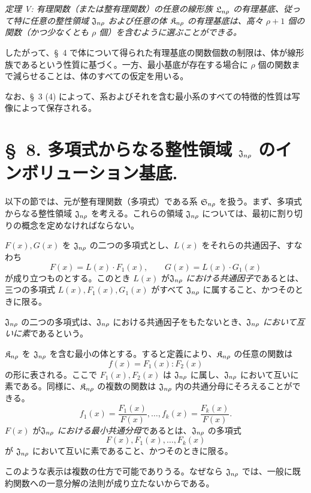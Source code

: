 \documentclass[11pt]{article}
\begin{document}
\emph{定理 V: 有理関数（または整有理関数）の任意の線形族 $\mathfrak{L}_{n\rho}$ の有理基底、従って特に任意の整性領域 $\mathfrak{J}_{n\rho}$ および任意の体 $\mathfrak{K}_{n\rho}$ の有理基底は、高々 $\rho+1$ 個の関数（かつ少なくとも $\rho$ 個）を含むように選ぶことができる。}

したがって、\S\ 4 で体について得られた有理基底の関数個数の制限は、体が線形族であるという性質に基づく。一方、最小基底が存在する場合に $\rho$ 個の関数まで減らせることは、体のすべての仮定を用いる。

なお、\S\ 3 (4) によって、系およびそれを含む最小系のすべての特徴的性質は写像によって保存される。

\section*{\S\ 8. 多項式からなる整性領域 $\mathfrak{J}_{n\rho}$ のインボリューション基底.}

以下の節では、元が整有理関数（多項式）である系 $\mathfrak{S}_{n\rho}$ を扱う。まず、多項式からなる整性領域 $\mathfrak{J}_{n\rho}$ を考える。これらの領域 $\mathfrak{J}_{n\rho}$ については、最初に割り切りの概念を定めなければならない。

$F(x),G(x)$ を $\mathfrak{J}_{n\rho}$ の二つの多項式とし、$L(x)$ をそれらの共通因子、すなわち
\[
  F(x)=L(x)\cdot F_1(x),\qquad G(x)=L(x)\cdot G_1(x)
\]
が成り立つものとする。このとき $L(x)$ が\emph{$\mathfrak{J}_{n\rho}$ における共通因子}であるとは、三つの多項式 $L(x),F_1(x),G_1(x)$ がすべて $\mathfrak{J}_{n\rho}$ に属すること、かつそのときに限る。

$\mathfrak{J}_{n\rho}$ の二つの多項式は、$\mathfrak{J}_{n\rho}$ における共通因子をもたないとき、\emph{$\mathfrak{J}_{n\rho}$ において互いに素}であるという。

$\mathfrak{K}_{n\rho}$ を $\mathfrak{J}_{n\rho}$ を含む最小の体とする。すると定義により、$\mathfrak{K}_{n\rho}$ の任意の関数は
\[
  f(x)=F_1(x):F_2(x)
\]
の形に表される。ここで $F_1(x),F_2(x)$ は $\mathfrak{J}_{n\rho}$ に属し、$\mathfrak{J}_{n\rho}$ において互いに素である。同様に、$\mathfrak{K}_{n\rho}$ の複数の関数は $\mathfrak{J}_{n\rho}$ 内の共通分母にそろえることができる。
\[
  f_1(x)=\frac{F_1(x)}{F(x)},\ldots,
  f_k(x)=\frac{F_k(x)}{F(x)}.
\]
$F(x)$ が\emph{$\mathfrak{J}_{n\rho}$ における最小共通分母}であるとは、$\mathfrak{J}_{n\rho}$ の多項式
\[
  F(x),F_1(x),\ldots,F_k(x)
\]
が $\mathfrak{J}_{n\rho}$ において互いに素であること、かつそのときに限る。

このような表示は複数の仕方で可能でありうる。なぜなら $\mathfrak{J}_{n\rho}$ では、一般に既約関数への一意分解の法則が成り立たないからである。
\end{document}

